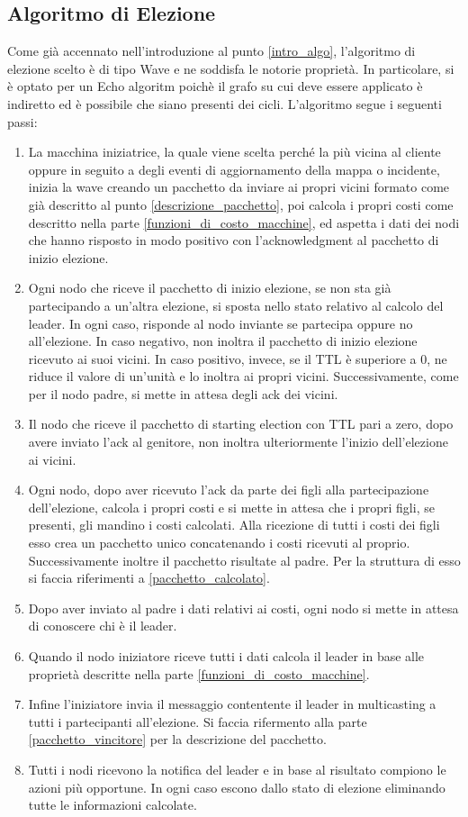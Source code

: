 \subsection{Algoritmo di Elezione}
Come già accennato nell'introduzione al punto \ref{intro_algo}, l'algoritmo di elezione scelto è di tipo Wave e ne soddisfa le notorie proprietà. In particolare, si è optato per un Echo algoritm poichè il grafo su cui deve essere applicato è indiretto ed è possibile che siano presenti dei cicli.
L'algoritmo segue i seguenti passi:
\begin{enumerate}
	\item La macchina iniziatrice, la quale viene scelta perché la più vicina al cliente oppure in seguito a degli eventi di aggiornamento della mappa o incidente, inizia la wave creando un pacchetto da inviare ai propri vicini formato come già descritto al punto \ref{descrizione_pacchetto}, poi calcola i propri costi come descritto nella parte \ref{funzioni_di_costo_macchine}, ed aspetta i dati dei nodi che hanno risposto in modo positivo con l'acknowledgment al pacchetto di inizio elezione.
	\item Ogni nodo che riceve il pacchetto di inizio elezione, se non sta già partecipando a un'altra elezione, si sposta nello stato relativo al calcolo del leader. In ogni caso, risponde al nodo inviante se partecipa oppure no all'elezione. In caso negativo, non inoltra il pacchetto di inizio elezione ricevuto ai suoi vicini. In caso positivo, invece, se il TTL è superiore a 0, ne riduce il valore di un'unità e lo inoltra ai propri vicini. Successivamente, come per il nodo padre, si mette in attesa degli ack dei vicini.
	\item Il nodo che riceve il pacchetto di starting election con TTL pari a zero, dopo avere inviato l'ack al genitore, non inoltra ulteriormente l'inizio dell'elezione ai vicini.
	\item Ogni nodo, dopo aver ricevuto l'ack da parte dei figli alla partecipazione dell'elezione, calcola i propri costi e si mette in attesa che i propri figli, se presenti, gli mandino i costi calcolati. Alla ricezione di tutti i costi dei figli esso crea un pacchetto unico concatenando i costi ricevuti al proprio. Successivamente inoltre il pacchetto risultate al padre. Per la struttura di esso si faccia riferimenti a \ref{pacchetto_calcolato}.
	\item Dopo aver inviato al padre i dati relativi ai costi, ogni nodo si mette in attesa di conoscere chi è il leader.
	\item Quando il nodo iniziatore riceve tutti i dati calcola il leader in base alle proprietà descritte nella parte \ref{funzioni_di_costo_macchine}. 
	\item Infine l'iniziatore invia il messaggio contentente il leader in multicasting a tutti i partecipanti all'elezione. Si faccia rifermento alla parte \ref{pacchetto_vincitore} per la descrizione del pacchetto.
	\item Tutti i nodi ricevono la notifica del leader e in base al risultato compiono le azioni più opportune. In ogni caso escono dallo stato di elezione eliminando tutte le informazioni calcolate.
\end{enumerate}

